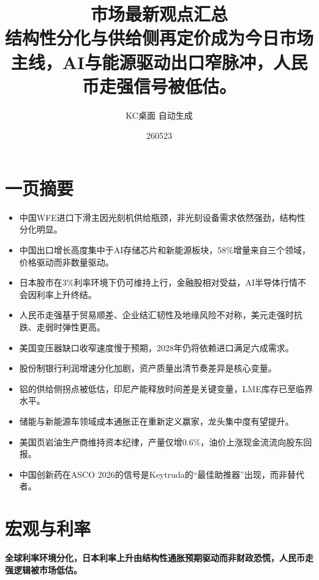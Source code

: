 \documentclass[11pt]{ctexart}
\title{\textbf{市场最新观点汇总}\\[0.4em]{\large 结构性分化与供给侧再定价成为今日市场主线，AI与能源驱动出口窄脉冲，人民币走强信号被低估。}}
\author{KC桌面 自动生成}
\date{260523}
\begin{document}
\maketitle
\section*{一页摘要}
\begin{itemize}
  \item 中国WFE进口下滑主因光刻机供给瓶颈，非光刻设备需求依然强劲，结构性分化明显。
  \item 中国出口增长高度集中于AI存储芯片和新能源板块，58\%增量来自三个领域，价格驱动而非数量驱动。
  \item 日本股市在3\%利率环境下仍可维持上行，金融股相对受益，AI半导体行情不会因利率上升终结。
  \item 人民币走强基于贸易顺差、企业结汇韧性及地缘风险不对称，美元走强时抗跌、走弱时弹性更高。
  \item 美国变压器缺口收窄速度慢于预期，2028年仍将依赖进口满足六成需求。
  \item 股份制银行利润增速分化加剧，资产质量出清节奏差异是核心变量。
  \item 铝的供给侧拐点被低估，印尼产能释放时间差是关键变量，LME库存已至临界水平。
  \item 储能与新能源车领域成本通胀正在重新定义赢家，龙头集中度有望提升。
  \item 美国页岩油生产商维持资本纪律，产量仅增0.6\%，油价上涨现金流流向股东回报。
  \item 中国创新药在ASCO 2026的信号是Keytruda的“最佳助推器”出现，而非替代者。
\end{itemize}
\section{宏观与利率}
\textbf{全球利率环境分化，日本利率上升由结构性通胀预期驱动而非财政恐慌，人民币走强逻辑被市场低估。}
\end{document}
